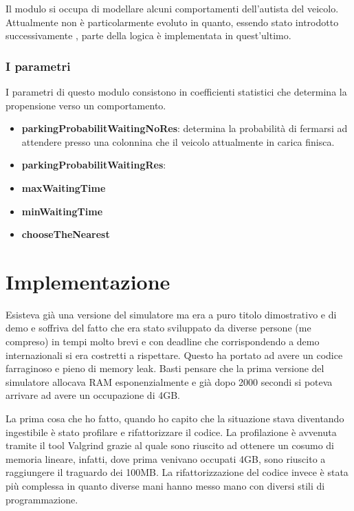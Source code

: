 Il modulo si occupa di modellare alcuni comportamenti dell'autista del veicolo. Attualmente non è particolarmente evoluto in quanto, essendo stato introdotto successivamente , parte della logica è implementata in quest'ultimo.

\subsubsection{I parametri}

I parametri di questo modulo consistono in coefficienti statistici che determina la propensione verso un comportamento.

\begin{itemize}
	\item \textbf{parkingProbabilitWaitingNoRes}: determina la probabilità di fermarsi ad attendere presso una colonnina che il veicolo attualmente in carica finisca.
	\item \textbf{parkingProbabilitWaitingRes}: 
	\item \textbf{maxWaitingTime}
	\item \textbf{minWaitingTime}
	\item \textbf{chooseTheNearest}
\end{itemize}



\section{Implementazione}

Esisteva già una versione del simulatore ma era a puro titolo dimostrativo e di demo e soffriva del fatto che era stato sviluppato da diverse persone (me compreso) in tempi molto brevi e con deadline che corrispondendo a demo internazionali si era costretti a rispettare. Questo ha portato ad avere un codice farraginoso e pieno di memory leak. Basti pensare che la prima versione del simulatore allocava RAM esponenzialmente e già dopo 2000 secondi si poteva arrivare ad avere un occupazione di 4GB.

La prima cosa che ho fatto, quando ho capito che la situazione stava diventando ingestibile è stato profilare e rifattorizzare il codice. La profilazione è avvenuta tramite il tool Valgrind grazie al quale sono riuscito ad ottenere un cosumo di memoria lineare, infatti, dove prima venivano occupati 4GB, sono riuscito a raggiungere il traguardo dei 100MB. La rifattorizzazione del codice invece è stata più complessa in quanto diverse mani hanno messo mano con diversi stili di programmazione. 

